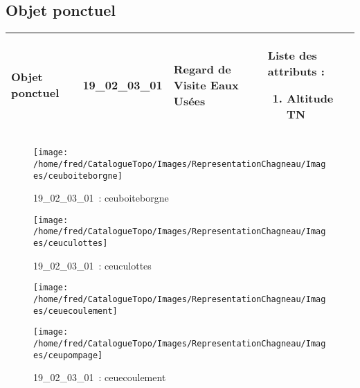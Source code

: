 \documentclass[12pt,titlepage]{book}
\begin{document}
\subsection{Objet ponctuel}
\noindent
\vspace{\baselineskip}

\renewcommand{\arraystretch}{1.2}
\begin{supertabular}{|p{10cm}|c|p{13cm}|p{12cm}|}
 Objet ponctuel & 19\_02\_03\_01 & Regard de Visite Eaux Usées & Liste des attributs :
\begin{enumerate}
  \item Altitude TN\end{enumerate}
\\
\hline
\end{supertabular}
\begin{figure}[h!]
  \hfill         %
  \begin{minipage}[t]{3cm}
    \begin{center}
      \texttt{[image: /home/fred/CatalogueTopo/Images/RepresentationChagneau/Images/ceuboiteborgne]}
      \caption[~19\_02\_03\_01]{\small{19\_02\_03\_01~:} \tiny{ceuboiteborgne}}\label{ceuboiteborgne}
    \end{center}
  \end{minipage}
  \begin{minipage}[t]{3cm}
    \begin{center}
      \texttt{[image: /home/fred/CatalogueTopo/Images/RepresentationChagneau/Images/ceuculottes]}
      \caption[~19\_02\_03\_01]{\small{19\_02\_03\_01~:} \tiny{ceuculottes}}\label{ceuculottes}
    \end{center}
  \end{minipage}
  \begin{minipage}[t]{3cm}
    \begin{center}
      \texttt{[image: /home/fred/CatalogueTopo/Images/RepresentationChagneau/Images/ceuecoulement]}
      \caption[~19\_02\_03\_01]{\small{19\_02\_03\_01~:} \tiny{ceuecoulement}}\label{ceuecoulement}
    \end{center}
  \end{minipage}
  \begin{minipage}[t]{3cm}
    \begin{center}
      \texttt{[image: /home/fred/CatalogueTopo/Images/RepresentationChagneau/Images/ceupompage]}

\end{center}
\end{minipage}
\end{figure}
\end{document}
